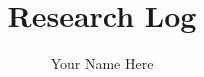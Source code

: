 \documentclass[11pt,letterpaper]{article}
\begin{document}
\title{\Huge Research Log}
\author{Your Name Here}
\maketitle
 
\tableofcontents

\pagebreak






\clearpage
\begin{appendices}

\clearpage

\end{appendices}
\end{document}
